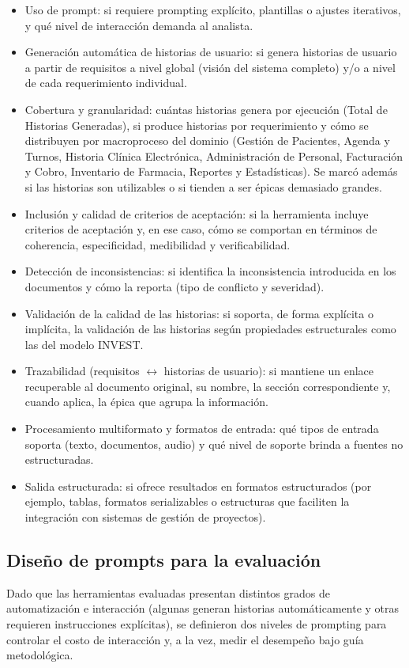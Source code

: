 \begin{itemize}
    \item Uso de prompt: si requiere prompting explícito, plantillas o ajustes iterativos, y qué nivel de interacción demanda al analista.
    \item Generación automática de historias de usuario: si genera historias de usuario a partir de requisitos a nivel global (visión del sistema completo) y/o a nivel de cada requerimiento individual.
    \item Cobertura y granularidad: cuántas historias genera por ejecución (Total de Historias Generadas), si produce historias por requerimiento y cómo se distribuyen por macroproceso del dominio (Gestión de Pacientes, Agenda y Turnos, Historia Clínica Electrónica, Administración de Personal, Facturación y Cobro, Inventario de Farmacia, Reportes y Estadísticas). Se marcó además si las historias son utilizables o si tienden a ser épicas demasiado grandes.
    \item Inclusión y calidad de criterios de aceptación: si la herramienta incluye criterios de aceptación y, en ese caso, cómo se comportan en términos de coherencia, especificidad, medibilidad y verificabilidad.
    \item Detección de inconsistencias: si identifica la inconsistencia introducida en los documentos y cómo la reporta (tipo de conflicto y severidad).
    \item Validación de la calidad de las historias: si soporta, de forma explícita o implícita, la validación de las historias según propiedades estructurales como las del modelo INVEST.
    \item Trazabilidad (requisitos $\leftrightarrow$ historias de usuario): si mantiene un enlace recuperable al documento original, su nombre, la sección correspondiente y, cuando aplica, la épica que agrupa la información.
    \item Procesamiento multiformato y formatos de entrada: qué tipos de entrada soporta (texto, documentos, audio) y qué nivel de soporte brinda a fuentes no estructuradas.
    \item Salida estructurada: si ofrece resultados en formatos estructurados (por ejemplo, tablas, formatos serializables o estructuras que faciliten la integración con sistemas de gestión de proyectos).
\end{itemize}

\subsection{Diseño de prompts para la evaluación}\label{sec:diseno-prompts}
Dado que las herramientas evaluadas presentan distintos grados de automatización e interacción (algunas generan historias automáticamente y otras requieren instrucciones explícitas), se definieron dos niveles de prompting para controlar el costo de interacción y, a la vez, medir el desempeño bajo guía metodológica.

